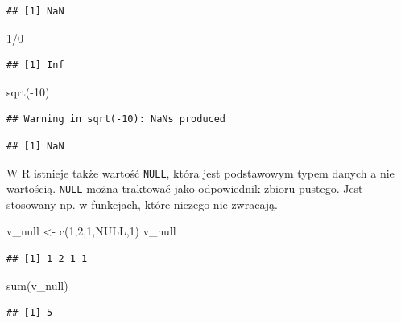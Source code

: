 \documentclass[
]{book}
\newenvironment{Shaded}{\begin{snugshade}}{\end{snugshade}}
\newcommand{\ConstantTok}[1]{\textcolor[rgb]{0.00,0.00,0.00}{#1}}
\newcommand{\DecValTok}[1]{\textcolor[rgb]{0.00,0.00,0.81}{#1}}
\newcommand{\FunctionTok}[1]{\textcolor[rgb]{0.00,0.00,0.00}{#1}}
\newcommand{\NormalTok}[1]{#1}
\newcommand{\OtherTok}[1]{\textcolor[rgb]{0.56,0.35,0.01}{#1}}
\newcommand{\SpecialCharTok}[1]{\textcolor[rgb]{0.00,0.00,0.00}{#1}}
\begin{document}
\begin{verbatim}
## [1] NaN
\end{verbatim}

\begin{Shaded}
\begin{Highlighting}[]
\DecValTok{1}\SpecialCharTok{/}\DecValTok{0}
\end{Highlighting}
\end{Shaded}

\begin{verbatim}
## [1] Inf
\end{verbatim}

\begin{Shaded}
\begin{Highlighting}[]
\FunctionTok{sqrt}\NormalTok{(}\SpecialCharTok{{-}}\DecValTok{10}\NormalTok{)}
\end{Highlighting}
\end{Shaded}

\begin{verbatim}
## Warning in sqrt(-10): NaNs produced
\end{verbatim}

\begin{verbatim}
## [1] NaN
\end{verbatim}

W R istnieje także wartość \texttt{NULL}, która jest podstawowym typem danych a nie wartością. \texttt{NULL} można traktować jako odpowiednik zbioru pustego. Jest stosowany np. w funkcjach, które niczego nie zwracają.

\begin{Shaded}
\begin{Highlighting}[]
\NormalTok{v\_null }\OtherTok{\textless{}{-}} \FunctionTok{c}\NormalTok{(}\DecValTok{1}\NormalTok{,}\DecValTok{2}\NormalTok{,}\DecValTok{1}\NormalTok{,}\ConstantTok{NULL}\NormalTok{,}\DecValTok{1}\NormalTok{)}
\NormalTok{v\_null}
\end{Highlighting}
\end{Shaded}

\begin{verbatim}
## [1] 1 2 1 1
\end{verbatim}

\begin{Shaded}
\begin{Highlighting}[]
\FunctionTok{sum}\NormalTok{(v\_null)}
\end{Highlighting}
\end{Shaded}

\begin{verbatim}
## [1] 5
\end{verbatim}
\end{document}
